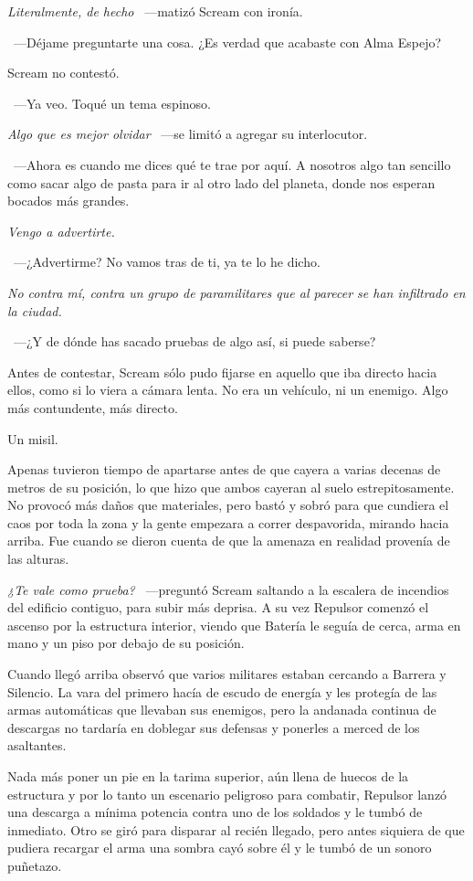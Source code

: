 \emph{Literalmente, de hecho} ~---matizó Scream con ironía.

~---Déjame preguntarte una cosa. ¿Es verdad que acabaste con Alma Espejo?

Scream no contestó.

~---Ya veo. Toqué un tema espinoso.

\emph{Algo que es mejor olvidar} ~---se limitó a agregar su interlocutor.

~---Ahora es cuando me dices qué te trae por aquí. A nosotros algo tan sencillo como sacar algo de pasta para ir al otro lado del planeta, donde nos esperan bocados más grandes.

\emph{Vengo a advertirte.}

~---¿Advertirme? No vamos tras de ti, ya te lo he dicho.

\emph{No contra mí, contra un grupo de paramilitares que al parecer se han infiltrado en la ciudad.}

~---¿Y de dónde has sacado pruebas de algo así, si puede saberse?

Antes de contestar, Scream sólo pudo fijarse en aquello que iba directo hacia ellos, como si lo viera a cámara lenta. No era un vehículo, ni un enemigo. Algo más contundente, más directo.

Un misil.

Apenas tuvieron tiempo de apartarse antes de que cayera a varias decenas de metros de su posición, lo que hizo que ambos cayeran al suelo estrepitosamente. No provocó más daños que materiales, pero bastó y sobró para que cundiera el caos por toda la zona y la gente empezara a correr despavorida, mirando hacia arriba. Fue cuando se dieron cuenta de que la amenaza en realidad provenía de las alturas.

\emph{¿Te vale como prueba?} ~---preguntó Scream saltando a la escalera de incendios del edificio contiguo, para subir más deprisa. A su vez Repulsor comenzó el ascenso por la estructura interior, viendo que Batería le seguía de cerca, arma en mano y un piso por debajo de su posición.

Cuando llegó arriba observó que varios militares estaban cercando a Barrera y Silencio. La vara del primero hacía de escudo de energía y les protegía de las armas automáticas que llevaban sus enemigos, pero la andanada continua de descargas no tardaría en doblegar sus defensas y ponerles a merced de los asaltantes.

Nada más poner un pie en la tarima superior, aún llena de huecos de la estructura y por lo tanto un escenario peligroso para combatir, Repulsor lanzó una descarga a mínima potencia contra uno de los soldados y le tumbó de inmediato. Otro se giró para disparar al recién llegado, pero antes siquiera de que pudiera recargar el arma una sombra cayó sobre él y le tumbó de un sonoro puñetazo.

